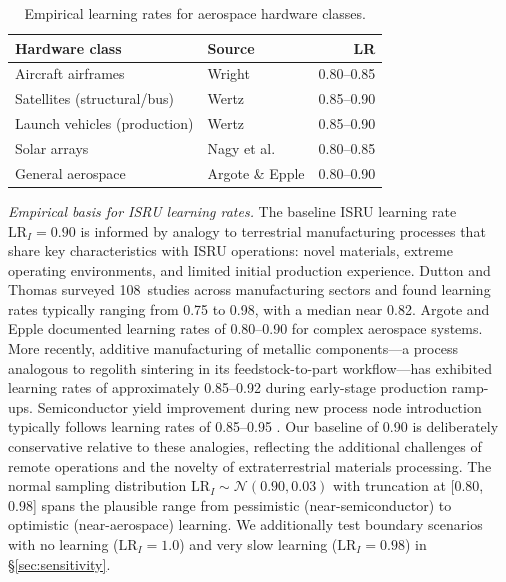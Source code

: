 \documentclass[preprint,12pt]{elsarticle}
\begin{document}
\begin{table}[htbp]
\centering
\caption{Empirical learning rates for aerospace hardware classes.}
\label{tab:learning_rates}
\small
\begin{tabular}{@{}llr@{}}
\toprule
Hardware class & Source & LR \\
\midrule
Aircraft airframes & Wright \cite{wright1936} & 0.80--0.85 \\
Satellites (structural/bus) & Wertz \cite{wertz2011} & 0.85--0.90 \\
Launch vehicles (production) & Wertz \cite{wertz2011} & 0.85--0.90 \\
Solar arrays & Nagy et al.\ \cite{nagy2013} & 0.80--0.85 \\
General aerospace & Argote \& Epple \cite{argote1990} & 0.80--0.90 \\
\bottomrule
\end{tabular}
\end{table}

\emph{Empirical basis for ISRU learning rates.} The baseline ISRU learning rate $\mathrm{LR}_I = 0.90$ is informed by analogy to terrestrial manufacturing processes that share key characteristics with ISRU operations: novel materials, extreme operating environments, and limited initial production experience. Dutton and Thomas \cite{dutton1984} surveyed 108~studies across manufacturing sectors and found learning rates typically ranging from 0.75 to 0.98, with a median near 0.82. Argote and Epple \cite{argote1990} documented learning rates of 0.80--0.90 for complex aerospace systems. More recently, additive manufacturing of metallic components---a process analogous to regolith sintering in its feedstock-to-part workflow---has exhibited learning rates of approximately 0.85--0.92 during early-stage production ramp-ups. Semiconductor yield improvement during new process node introduction typically follows learning rates of 0.85--0.95 \cite{nagy2013}. Our baseline of 0.90 is deliberately conservative relative to these analogies, reflecting the additional challenges of remote operations and the novelty of extraterrestrial materials processing. The normal sampling distribution $\mathrm{LR}_I \sim \mathcal{N}(0.90, 0.03)$ with truncation at [0.80, 0.98] spans the plausible range from pessimistic (near-semiconductor) to optimistic (near-aerospace) learning. We additionally test boundary scenarios with no learning ($\mathrm{LR}_I = 1.0$) and very slow learning ($\mathrm{LR}_I = 0.98$) in \S\ref{sec:sensitivity}.
\end{document}
